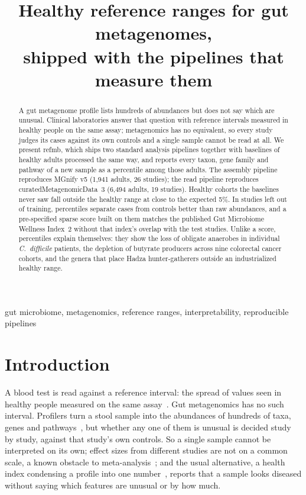 \documentclass[conference]{IEEEtran}
\newcommand{\cdiff}{\textit{C.~difficile}}
\begin{document}
\title{Healthy reference ranges for gut metagenomes,\\shipped with the pipelines that measure them}
\author{\IEEEauthorblockN{[Authors]}\IEEEauthorblockA{[Affiliation]}}
\maketitle

\begin{abstract}
A gut metagenome profile lists hundreds of abundances but does not say which are unusual. Clinical laboratories answer that question with reference intervals measured in healthy people on the same assay; metagenomics has no equivalent, so every study judges its cases against its own controls and a single sample cannot be read at all. We present refmb, which ships two standard analysis pipelines together with baselines of healthy adults processed the same way, and reports every taxon, gene family and pathway of a new sample as a percentile among those adults. The assembly pipeline reproduces MGnify v5 (1{,}941 adults, 26 studies); the read pipeline reproduces curatedMetagenomicData~3 (6{,}494 adults, 19 studies). Healthy cohorts the baselines never saw fall outside the healthy range at close to the expected 5\%. In studies left out of training, percentiles separate cases from controls better than raw abundances, and a pre-specified sparse score built on them matches the published Gut Microbiome Wellness Index~2 without that index's overlap with the test studies. Unlike a score, percentiles explain themselves: they show the loss of obligate anaerobes in individual \cdiff{} patients, the depletion of butyrate producers across nine colorectal cancer cohorts, and the genera that place Hadza hunter-gatherers outside an industrialized healthy range.
\end{abstract}

\begin{IEEEkeywords}
gut microbiome, metagenomics, reference ranges, interpretability, reproducible pipelines
\end{IEEEkeywords}

\section{Introduction}

A blood test is read against a reference interval: the spread of values seen in healthy people measured on the same assay~\cite{horn2003}. Gut metagenomics has no such interval. Profilers turn a stool sample into the abundances of hundreds of taxa, genes and pathways~\cite{beghini2021,richardson2023}, but whether any one of them is unusual is decided study by study, against that study's own controls. So a single sample cannot be interpreted on its own; effect sizes from different studies are not on a common scale, a known obstacle to meta-analysis~\cite{duvallet2017}; and the usual alternative, a health index condensing a profile into one number~\cite{gupta2020,chang2024}, reports that a sample looks diseased without saying which features are unusual or by how much.
\end{document}

